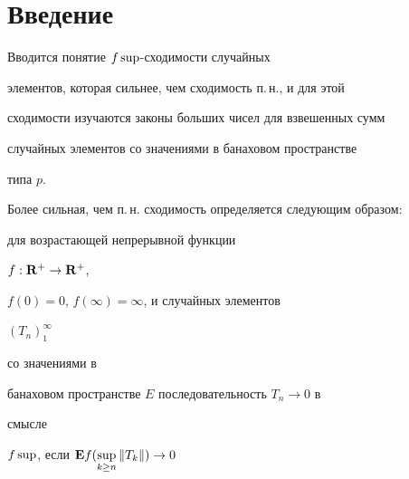  


\date{} 




 


\pagestyle{plain} %


 


 




 


\maketitle 


 







\section{Введение}





Вводится понятие $f\sup$-сходимости случайных


элементов, которая сильнее, чем сходимость п.\,н., и для этой


сходимости изучаются законы больших чисел для взвешенных сумм


случайных элементов со значениями в банаховом пространстве


типа $p$.





Более сильная, чем п.\,н. сходимость определяется следующим образом:


для возрастающей непрерывной функции


$f:\bold R^+ \to\bold R^+$,


$f(0)=0$, $f(\infty )=\infty$, и случайных элементов


$(T_n)^{\infty }_1$


со значениями в


банаховом пространстве $E$ последовательность $T_n\to 0$ в


смысле


$f\sup$, если $\bold E f(\sup\limits_{k\ge n}\| T_k \|)\to 0$


